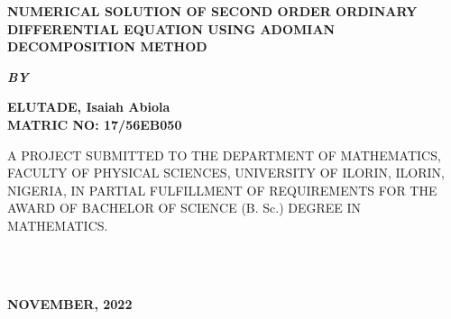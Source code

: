 \documentclass[11pt]{report}
\newcommand{\bt}[1]{\textbf{#1}}
\begin{document}
	
	\clearpage
	\thispagestyle{empty}
	\begin{center}
		\Large \bt{NUMERICAL SOLUTION OF SECOND ORDER ORDINARY DIFFERENTIAL EQUATION USING ADOMIAN DECOMPOSITION METHOD}
	\end{center}

	\hspace{7cm}
	
	\begin{center}
		\textbf{\textit{BY}}
	\end{center}
	
	\hspace{5cm}
	
	\begin{center}
		\large \textbf{ELUTADE, Isaiah Abiola
			\\
			MATRIC NO: 17/56EB050}
	\end{center}
	
	\hspace{9cm}
	
	\begin{center}
		A PROJECT SUBMITTED TO THE DEPARTMENT OF MATHEMATICS, FACULTY OF PHYSICAL SCIENCES, UNIVERSITY OF ILORIN, ILORIN, NIGERIA, IN PARTIAL FULFILLMENT OF REQUIREMENTS FOR THE AWARD OF BACHELOR OF SCIENCE (B. Sc.) DEGREE IN MATHEMATICS.
	\end{center}

	\hspace{7cm}
	
%	
~~~~~~
	\\ \\ 
	\begin{center}
		\textbf{NOVEMBER, 2022}
	\end{center}

	\newpage
\end{document}
